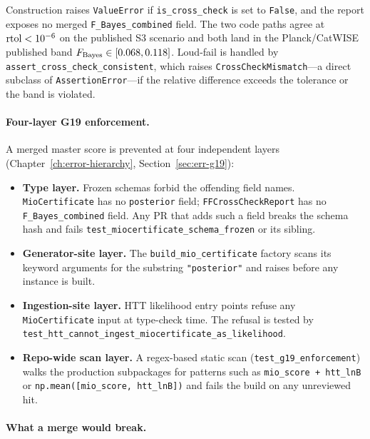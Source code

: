 Construction raises \texttt{ValueError} if
\texttt{is\_cross\_check} is set to \texttt{False}, and the
report exposes no merged \texttt{F\_Bayes\_combined} field.
The two code paths agree at ${\rm rtol} < 10^{-6}$ on the
published S3 scenario and both land in the Planck/CatWISE
published band $F_{\rm Bayes} \in [0.068, 0.118]$.  Loud-fail
is handled by \texttt{assert\_cross\_check\_consistent},
which raises \texttt{CrossCheckMismatch}---a direct subclass
of \texttt{AssertionError}---if the relative difference
exceeds the tolerance or the band is violated.

\paragraph{Four-layer G19 enforcement.}

A merged master score is prevented at four independent
layers (Chapter~\ref{ch:error-hierarchy},
Section~\ref{sec:err-g19}):

\begin{itemize}
\item \textbf{Type layer.}  Frozen schemas forbid the
  offending field names.  \texttt{MioCertificate} has no
  \texttt{posterior} field; \texttt{FFCrossCheckReport}
  has no \texttt{F\_Bayes\_combined} field.  Any PR that
  adds such a field breaks the schema hash and fails
  \texttt{test\_miocertificate\_schema\_frozen} or its
  sibling.
\item \textbf{Generator-site layer.} The
  \texttt{build\_mio\_certificate} factory scans its
  keyword arguments for the substring
  \texttt{"posterior"} and raises before any instance is
  built.
\item \textbf{Ingestion-site layer.} HTT likelihood entry
  points refuse any
  \texttt{MioCertificate} input at type-check time.  The
  refusal is tested by
  \texttt{test\_htt\_cannot\_ingest\_miocertificate\_as\_likelihood}.
\item \textbf{Repo-wide scan layer.} A regex-based static
  scan (\texttt{test\_g19\_enforcement}) walks the
  production subpackages for patterns such as
  \texttt{mio\_score + htt\_lnB} or
  \texttt{np.mean([mio\_score, htt\_lnB])} and fails the
  build on any unreviewed hit.
\end{itemize}

\paragraph{What a merge would break.}

